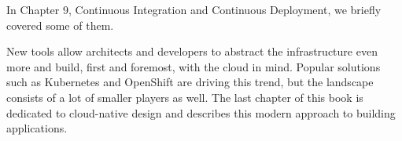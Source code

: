 In Chapter 9, Continuous Integration and Continuous Deployment, we briefly covered some of them.



New tools allow architects and developers to abstract the infrastructure even more and build, first and foremost, with the cloud in mind. Popular solutions such as Kubernetes and OpenShift are driving this trend, but the landscape consists of a lot of smaller players as well. The last chapter of this book is dedicated to cloud-native design and describes this modern approach to building applications.




